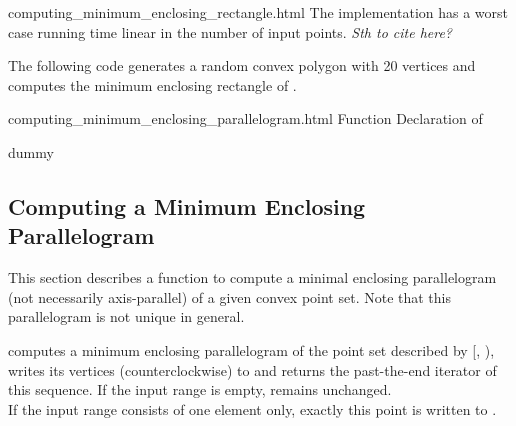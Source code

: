 \begin{ccHtmlClassFile}{computing_minimum_enclosing_rectangle.html}
  \ccImplementation The implementation has a worst case running time
  linear in the number of input points. \textit{Sth to cite here?}
  
  \ccExample The following code generates a random convex polygon
   with 20 vertices and computes the minimum enclosing
  rectangle of .


\end{ccHtmlClassFile}
    
\ccHtmlNoClassToc
\begin{ccHtmlClassFile}{computing_minimum_enclosing_parallelogram.html}
  {Function Declaration of }
  \ccHtmlNoClassIndex\ccHtmlNoClassLinks
  \begin{ccClass}{dummy}
    \ccHtmlNoIndex\subsection{Computing a Minimum Enclosing Parallelogram}
  \label{secMinimumEnclosingParallelogramm}
  \end{ccClass}
  
  This section describes a function to compute a minimal enclosing
  parallelogram (not necessarily axis-parallel) of a given convex
  point set. Note that this parallelogram is not unique in general.


  \def\ccLongParamLayout{\ccTrue} 
  
  
  computes a minimum enclosing parallelogram of the point set
  described by [, ), writes its
  vertices (counterclockwise) to  and returns the past-the-end
  iterator of this sequence.
  If the input range is empty,  remains unchanged.\\
  If the input range consists of one element only,
  exactly this point is written to .\\
  

\end{ccHtmlClassFile}

